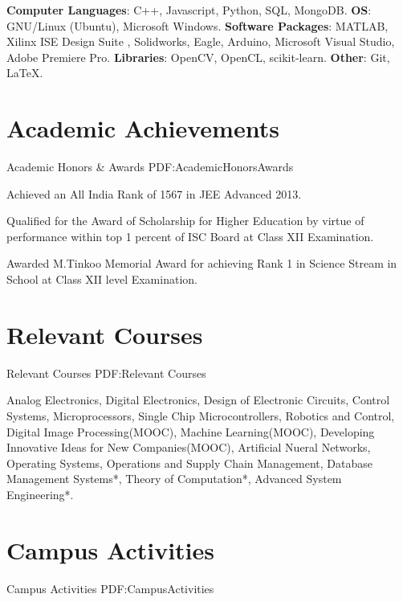 \documentclass[a4paper,10pt,oneside]{article}
\begin{document}
\begin{body}
{{\textbf{Computer Languages}}: C++, Javascript, Python, SQL, MongoDB.
\SmallEntryGap
{\textbf{OS}}: GNU/Linux (Ubuntu), Microsoft Windows.
\SmallEntryGap
{\textbf{Software Packages}}: MATLAB, Xilinx ISE Design Suite , Solidworks, Eagle, Arduino, Microsoft Visual Studio, Adobe Premiere Pro.
\SmallEntryGap
{\textbf{Libraries}}: OpenCV, OpenCL, scikit-learn.
\SmallEntryGap
{\textbf{Other}}: Git, \LaTeX.


\section
{Academic \newline
Achievements}
{Academic Honors \& Awards}
{PDF:AcademicHonorsAwards}

\BulletItem
Achieved an All India Rank of 1567 in JEE Advanced 2013.

\SmallEntryGap

\BulletItem
Qualified for the Award of Scholarship for Higher Education by virtue
of performance within top 1 percent of ISC Board at Class XII Examination.

\SmallEntryGap
\BulletItem
 Awarded M.Tinkoo Memorial Award for achieving Rank 1 in Science
Stream in School at Class XII level Examination.


\section
{Relevant Courses}
{Relevant Courses}
{PDF:Relevant Courses}

Analog Electronics, Digital Electronics, Design of Electronic Circuits,
Control Systems, Microprocessors, Single Chip Microcontrollers, Robotics and Control, Digital Image Processing(MOOC), Machine Learning(MOOC), Developing Innovative Ideas for New Companies(MOOC), Artificial Nueral Networks, Operating Systems, Operations and Supply Chain Management, Database Management Systems*, Theory of Computation*, Advanced System Engineering*.


\section
{Campus Activities}
{Campus Activities}
{PDF:CampusActivities}


}
\end{body}
\end{document}
